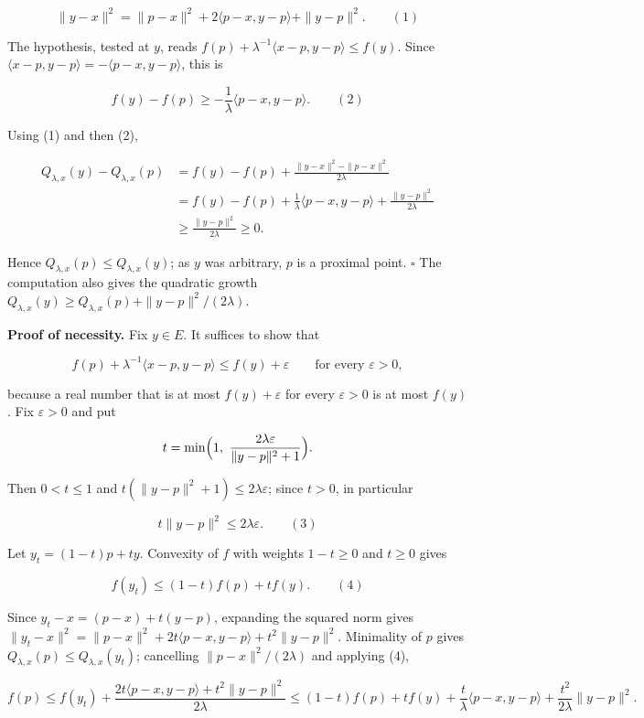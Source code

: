 \documentclass[11pt,a4paper]{report}
\begin{document}
\[\|y-x\|^2=\|p-x\|^2+2\langle p-x,y-p\rangle+\|y-p\|^2.\qquad(1)\]


The hypothesis, tested at \(y\), reads \(f(p)+\lambda^{-1}\langle x-p,y-p\rangle\le f(y)\). Since \(\langle x-p,y-p\rangle=-\langle p-x,y-p\rangle\), this is


\[f(y)-f(p)\ge-\frac1\lambda\langle p-x,y-p\rangle.\qquad(2)\]


Using (1) and then (2),


\[\begin{aligned}
Q_{\lambda,x}(y)-Q_{\lambda,x}(p)&=f(y)-f(p)+\frac{\|y-x\|^2-\|p-x\|^2}{2\lambda}\\
&=f(y)-f(p)+\frac1\lambda\langle p-x,y-p\rangle+\frac{\|y-p\|^2}{2\lambda}\\
&\ge\frac{\|y-p\|^2}{2\lambda}\ge0 .
\end{aligned}\]


Hence \(Q_{\lambda,x}(p)\le Q_{\lambda,x}(y)\); as \(y\) was arbitrary, \(p\) is a proximal point. \(\square\) The computation also gives the quadratic growth \(Q_{\lambda,x}(y)\ge Q_{\lambda,x}(p)+\|y-p\|^2/(2\lambda)\).




\textbf{Proof of necessity.} Fix \(y\in E\). It suffices to show that


\[f(p)+\lambda^{-1}\langle x-p,y-p\rangle\le f(y)+\varepsilon\qquad\text{for every }\varepsilon>0,\]


because a real number that is at most \(f(y)+\varepsilon\) for every \(\varepsilon>0\) is at most \(f(y)\). Fix \(\varepsilon>0\) and put


\[t=\min\Bigl(1,\ \frac{2\lambda\varepsilon}{\|y-p\|^2+1}\Bigr).\]


Then \(0<t\le1\) and \(t(\|y-p\|^2+1)\le2\lambda\varepsilon\); since \(t>0\), in particular


\[t\|y-p\|^2\le2\lambda\varepsilon.\qquad(3)\]


Let \(y_t=(1-t)p+ty\). Convexity of \(f\) with weights \(1-t\ge0\) and \(t\ge0\) gives


\[f(y_t)\le(1-t)f(p)+tf(y).\qquad(4)\]


Since \(y_t-x=(p-x)+t(y-p)\), expanding the squared norm gives \(\|y_t-x\|^2=\|p-x\|^2+2t\langle p-x,y-p\rangle+t^2\|y-p\|^2\). Minimality of \(p\) gives \(Q_{\lambda,x}(p)\le Q_{\lambda,x}(y_t)\); cancelling \(\|p-x\|^2/(2\lambda)\) and applying (4),


\[f(p)\le f(y_t)+\frac{2t\langle p-x,y-p\rangle+t^2\|y-p\|^2}{2\lambda}\le(1-t)f(p)+tf(y)+\frac{t}{\lambda}\langle p-x,y-p\rangle+\frac{t^2}{2\lambda}\|y-p\|^2.\]
\end{document}
